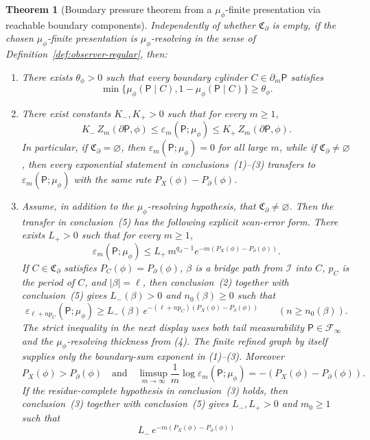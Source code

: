 \documentclass{etds}%
\numberwithin{equation}{section}
\theoremstyle{plain}
\newtheorem{theorem}{Theorem}[section]
\theoremstyle{definition}
\theoremstyle{remark}
\begin{document}
\begin{theorem}[Boundary pressure theorem from a $\mu_\phi$-finite presentation via reachable boundary components]
Independently of whether $\mathfrak{C}_\partial$ is empty, if the chosen
$\mu_\phi$-finite presentation is $\mu_\phi$-resolving in the sense of
Definition~\ref{def:observer-regular}, then:
\begin{enumerate}[label=(\arabic*),resume*]
\item There exists $\theta_\phi>0$ such that every boundary cylinder
  $C\in\partial_m\mathsf{P}$ satisfies
  \[
  \min\{\mu_\phi(\mathsf{P}\mid C),1-\mu_\phi(\mathsf{P}\mid C)\}\ge \theta_\phi.
  \]
\item There exist constants $K_-,K_+>0$ such that for every $m\ge 1$,
  \[
  K_-\,Z_m(\partial\mathsf{P},\phi)
  \le \varepsilon_m(\mathsf{P};\mu_\phi)
  \le K_+\,Z_m(\partial\mathsf{P},\phi).
  \]
  In particular, if $\mathfrak{C}_\partial=\varnothing$, then
  $\varepsilon_m(\mathsf{P};\mu_\phi)=0$ for all large $m$, while if
  $\mathfrak{C}_\partial\neq\varnothing$, then every exponential statement in
  conclusions~\emph{(1)}--\emph{(3)} transfers to
  $\varepsilon_m(\mathsf{P};\mu_\phi)$ with the same rate
  $P_X(\phi)-P_\partial(\phi)$.
\item Assume, in addition to the $\mu_\phi$-resolving hypothesis, that
  $\mathfrak{C}_\partial\neq\varnothing$.  Then the transfer in
  conclusion~\emph{(5)} has the following explicit scan-error form.
  There exists $L_+>0$ such that for every $m\ge 1$,
  \[
  \varepsilon_m(\mathsf{P};\mu_\phi)
  \le L_+\,m^{q_\partial-1}e^{-m(P_X(\phi)-P_\partial(\phi))}.
  \]
  If $C\in\mathfrak{C}_\partial$ satisfies
  $P_C(\phi)=P_\partial(\phi)$, $\beta$ is a bridge path from
  $\mathcal{I}$ into $C$, $p_C$ is the period of $C$, and $|\beta|=\ell$, then
  conclusion~\emph{(2)} together with conclusion~\emph{(5)} gives
  $L_-(\beta)>0$ and $n_0(\beta)\ge 0$ such that
  \[
  \varepsilon_{\ell+np_C}(\mathsf{P};\mu_\phi)
  \ge L_-(\beta)\,
  e^{-(\ell+np_C)(P_X(\phi)-P_\partial(\phi))}
  \qquad(n\ge n_0(\beta)).
  \]
  The strict inequality in the next display uses both tail measurability
  $\mathsf{P}\in\mathcal{F}_\infty$ and the $\mu_\phi$-resolving thickness from
  \emph{(4)}.  The finite refined graph by itself supplies only the boundary-sum
  exponent in \emph{(1)}--\emph{(3)}.  Moreover
  \[
  P_X(\phi)>P_\partial(\phi)
  \quad\text{and}\quad
  \limsup_{m\to\infty}\frac1m\log\varepsilon_m(\mathsf{P};\mu_\phi)
  =-(P_X(\phi)-P_\partial(\phi)).
  \]
  If the residue-complete hypothesis in conclusion~\emph{(3)} holds, then
  conclusion~\emph{(3)} together with conclusion~\emph{(5)} gives
  $L_-,L_+>0$ and $m_0\ge 1$ such that
  \[
  L_-\,e^{-m(P_X(\phi)-P_\partial(\phi))}
\]
\end{enumerate}
\end{theorem}
\end{document}
